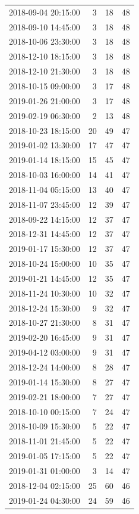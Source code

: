 \begin{tabular}{lrrr}
2018-09-04 20:15:00 & 3 & 18 & 48 \\
2018-09-10 14:45:00 & 3 & 18 & 48 \\
2018-10-06 23:30:00 & 3 & 18 & 48 \\
2018-12-10 18:15:00 & 3 & 18 & 48 \\
2018-12-10 21:30:00 & 3 & 18 & 48 \\
2018-10-15 09:00:00 & 3 & 17 & 48 \\
2019-01-26 21:00:00 & 3 & 17 & 48 \\
2019-02-19 06:30:00 & 2 & 13 & 48 \\
2018-10-23 18:15:00 & 20 & 49 & 47 \\
2019-01-02 13:30:00 & 17 & 47 & 47 \\
2019-01-14 18:15:00 & 15 & 45 & 47 \\
2018-10-03 16:00:00 & 14 & 41 & 47 \\
2018-11-04 05:15:00 & 13 & 40 & 47 \\
2018-11-07 23:45:00 & 12 & 39 & 47 \\
2018-09-22 14:15:00 & 12 & 37 & 47 \\
2018-12-31 14:45:00 & 12 & 37 & 47 \\
2019-01-17 15:30:00 & 12 & 37 & 47 \\
2018-10-24 15:00:00 & 10 & 35 & 47 \\
2019-01-21 14:45:00 & 12 & 35 & 47 \\
2018-11-24 10:30:00 & 10 & 32 & 47 \\
2018-12-24 15:30:00 & 9 & 32 & 47 \\
2018-10-27 21:30:00 & 8 & 31 & 47 \\
2019-02-20 16:45:00 & 9 & 31 & 47 \\
2019-04-12 03:00:00 & 9 & 31 & 47 \\
2018-12-24 14:00:00 & 8 & 28 & 47 \\
2019-01-14 15:30:00 & 8 & 27 & 47 \\
2019-02-21 18:00:00 & 7 & 27 & 47 \\
2018-10-10 00:15:00 & 7 & 24 & 47 \\
2018-10-09 15:30:00 & 5 & 22 & 47 \\
2018-11-01 21:45:00 & 5 & 22 & 47 \\
2019-01-05 17:15:00 & 5 & 22 & 47 \\
2019-01-31 01:00:00 & 3 & 14 & 47 \\
2018-12-04 02:15:00 & 25 & 60 & 46 \\
2019-01-24 04:30:00 & 24 & 59 & 46 \\

\end{tabular}
